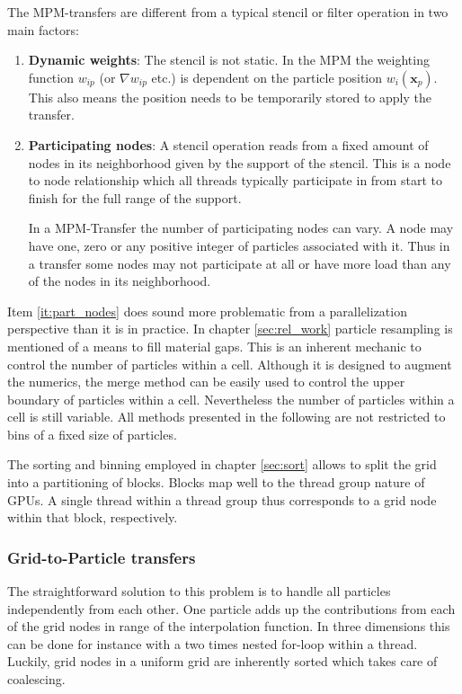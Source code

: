 \documentclass[m,times]{cgMA}
\begin{document}
The MPM-transfers are different from a typical stencil or filter operation in two main factors:
\begin{enumerate}
  \item \textbf{Dynamic weights}: The stencil is not static. In the MPM the weighting function $w_{ip}$ (or $\nabla w_{ip}$ etc.) is dependent on the particle position $w_i(\boldsymbol{x}_p)$. This also means the position needs to be temporarily stored to apply the transfer.
  \item \label{it:part_nodes} \textbf{Participating nodes}: A stencil operation reads from a fixed amount of nodes in its neighborhood given by the support of the stencil. This is a node to node relationship which all threads typically participate in from start to finish for the full range of the support.

In a MPM-Transfer the number of participating nodes can vary. A node may have one, zero or any positive integer of particles associated with it. Thus in a transfer some nodes may not participate at all or have more load than any of the nodes in its neighborhood.
\end{enumerate}
Item \ref{it:part_nodes} does sound more problematic from a parallelization perspective than it is in practice. In chapter \ref{sec:rel_work} particle resampling is mentioned of a means to fill material gaps. This is an inherent mechanic to control the number of particles within a cell. Although it is designed to augment the numerics, the merge method can be easily used to control the upper boundary of particles within a cell. Nevertheless the number of particles within a cell is still variable. All methods presented in the following are not restricted to bins of a fixed size of particles.

The sorting and binning employed in chapter \ref{sec:sort} allows to split the grid into a partitioning of blocks. Blocks map well to the thread group nature of GPUs. A single thread within a thread group thus corresponds to a grid node within that block, respectively.

\subsubsection{Grid-to-Particle transfers}\label{sec:g2p}
The straightforward solution to this problem is to handle all particles independently from each other. One particle adds up the contributions from each of the grid nodes in range of the interpolation function. In three dimensions this can be done for instance with a two times nested for-loop within a thread. Luckily, grid nodes in a uniform grid are inherently sorted which takes care of coalescing.
\end{document}
